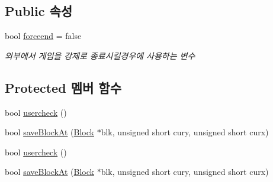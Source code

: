 \subsection*{Public 속성}
\begin{DoxyCompactItemize}
\item 
bool \hyperlink{class_tetris_1_1_game_controller_a015411333b232483387d89f3ba0617e0}{forceend} = false
\begin{DoxyCompactList}\small\item\em 외부에서 게임을 강제로 종료시킬경우에 사용하는 변수 \end{DoxyCompactList}\end{DoxyCompactItemize}
\subsection*{Protected 멤버 함수}
\begin{DoxyCompactItemize}
\item 
bool \hyperlink{class_tetris_1_1_game_controller_ab96e22daad51119b35cbee8cfb7385ef}{usercheck} ()
\item 
bool \hyperlink{class_tetris_1_1_game_controller_adc067380df0f0da4ea4a358d00d6a123}{save\+Block\+At} (\hyperlink{class_tetris_1_1_block}{Block} $\ast$blk, unsigned short cury, unsigned short curx)
\item 
bool \hyperlink{class_tetris_1_1_game_controller_ab96e22daad51119b35cbee8cfb7385ef}{usercheck} ()
\item 
bool \hyperlink{class_tetris_1_1_game_controller_adc067380df0f0da4ea4a358d00d6a123}{save\+Block\+At} (\hyperlink{class_tetris_1_1_block}{Block} $\ast$blk, unsigned short cury, unsigned short curx)
\end{DoxyCompactItemize}
